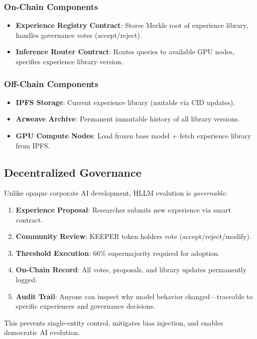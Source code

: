 \subsubsection{On-Chain Components}
\begin{itemize}
    \item \textbf{Experience Registry Contract}: Stores Merkle root of experience library, handles governance votes (accept/reject).
    \item \textbf{Inference Router Contract}: Routes queries to available GPU nodes, specifies experience library version.
\end{itemize}

\subsubsection{Off-Chain Components}
\begin{itemize}
    \item \textbf{IPFS Storage}: Current experience library (mutable via CID updates).
    \item \textbf{Arweave Archive}: Permanent immutable history of all library versions.
    \item \textbf{GPU Compute Nodes}: Load frozen base model + fetch experience library from IPFS.
\end{itemize}

\subsection{Decentralized Governance}

Unlike opaque corporate AI development, HLLM evolution is \textit{governable}:

\begin{enumerate}
    \item \textbf{Experience Proposal}: Researcher submits new experience via smart contract.
    \item \textbf{Community Review}: KEEPER token holders vote (accept/reject/modify).
    \item \textbf{Threshold Execution}: 66\% supermajority required for adoption.
    \item \textbf{On-Chain Record}: All votes, proposals, and library updates permanently logged.
    \item \textbf{Audit Trail}: Anyone can inspect why model behavior changed—traceable to specific experiences and governance decisions.
\end{enumerate}

This prevents single-entity control, mitigates bias injection, and enables democratic AI evolution.

